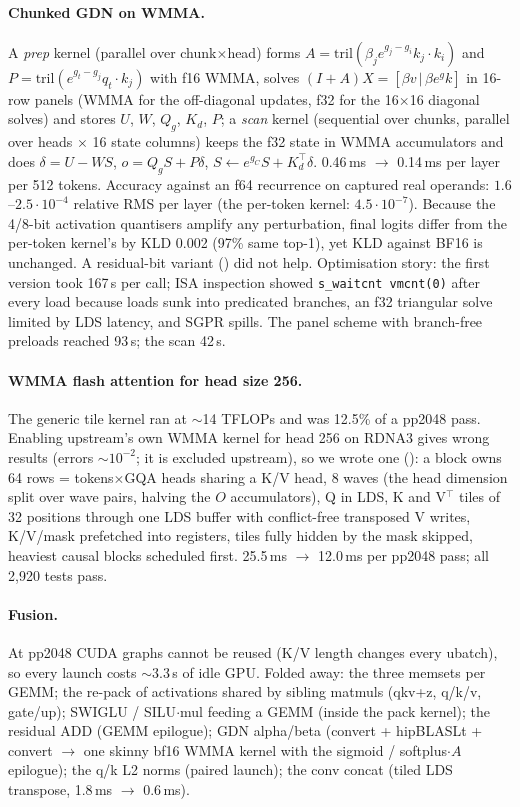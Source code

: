 \documentclass[10pt,a4paper]{article}
\newcommand{\tx}[1]{\texttt{\detokenize{#1}}}
\newcommand{\txl}[1]{\texttt{\expandafter\seqsplit\expandafter{\detokenize{#1}}}}
\begin{document}
\paragraph{Chunked GDN on WMMA.} A \emph{prep} kernel (parallel over chunk$\times$head) forms $A=\mathrm{tril}(\beta_j e^{g_j-g_i}k_j\!\cdot\!k_i)$
and $P=\mathrm{tril}(e^{g_t-g_j}q_t\!\cdot\!k_j)$ with f16 WMMA, solves $(I+A)X=[\beta v\,|\,\beta e^{g}k]$ in 16-row panels (WMMA for the off-diagonal
updates, f32 for the 16$\times$16 diagonal solves) and stores $U$, $W$, $Q_g$, $K_d$, $P$; a \emph{scan} kernel (sequential over chunks,
parallel over heads $\times$ 16 state columns) keeps the f32 state in WMMA accumulators and does $\delta=U-WS$, $o=Q_gS+P\delta$,
$S\leftarrow e^{g_C}S+K_d^{\!\top}\delta$. 0.46\,ms $\to$ 0.14\,ms per layer per 512 tokens. Accuracy against an f64 recurrence on captured real
operands: $1.6$--$2.5\cdot10^{-4}$ relative RMS per layer (the per-token kernel: $4.5\cdot10^{-7}$). Because the 4/8-bit activation
quantisers amplify any perturbation, final logits differ from the per-token kernel's by KLD 0.002 (97\% same top-1), yet KLD against BF16 is
unchanged. A residual-bit variant (\tx{GGML_GDN_CHUNK=2}) did not help. Optimisation story: the first version took 167\,\textmu s per call; ISA inspection
showed \texttt{s\_waitcnt vmcnt(0)} after every load because loads sunk into predicated branches, an f32 triangular solve limited by LDS latency, and
SGPR spills. The panel scheme with branch-free preloads reached 93\,\textmu s; the scan 42\,\textmu s.

\paragraph{WMMA flash attention for head size 256.} The generic tile kernel ran at $\sim$14 TFLOPs and was 12.5\% of a \tx{fast} pp2048 pass.
Enabling upstream's own WMMA kernel for head 256 on RDNA3 gives wrong results (errors $\sim10^{-2}$; it is excluded upstream), so we wrote one
(\txl{fattn-rdna3.cu}): a block owns 64 rows = tokens$\times$GQA heads sharing a K/V head, 8 waves (the head dimension split over wave pairs, halving the
$O$ accumulators), Q in LDS, K and V$^{\!\top}$ tiles of 32 positions through one LDS buffer with conflict-free transposed V writes, K/V/mask
prefetched into registers, tiles fully hidden by the mask skipped, heaviest causal blocks scheduled first. 25.5\,ms $\to$ 12.0\,ms per pp2048 pass;
all 2{,}920 \tx{FLASH_ATTN_EXT} tests pass.

\paragraph{Fusion.} At pp2048 CUDA graphs cannot be reused (K/V length changes every ubatch), so every launch costs $\sim$3.3\,\textmu s of idle GPU. Folded
away: the three memsets per GEMM; the re-pack of activations shared by sibling matmuls (qkv+z, q/k/v, gate/up); SWIGLU / SILU$\cdot$mul feeding a GEMM (inside the pack kernel);
the residual ADD (GEMM epilogue); GDN alpha/beta (convert + hipBLASLt + convert $\to$ one skinny bf16 WMMA kernel with the sigmoid / softplus$\cdot A$ epilogue); the q/k L2 norms
(paired launch); the conv concat (tiled LDS transpose, 1.8\,ms $\to$ 0.6\,ms).
\end{document}
